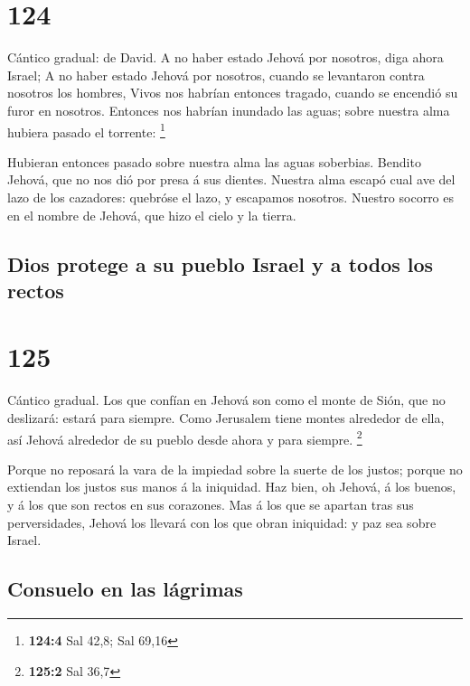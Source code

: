 \hypertarget{section-123}{%
\section{124}\label{section-123}}

 Cántico gradual: de David. A no haber estado Jehová por
nosotros, diga ahora Israel;  A no haber estado Jehová por
nosotros, cuando se levantaron contra nosotros los hombres, 
Vivos nos habrían entonces tragado, cuando se encendió su furor en
nosotros.  Entonces nos habrían inundado las aguas; sobre
nuestra alma hubiera pasado el torrente: \footnote{\textbf{124:4} Sal
  42,8; Sal 69,16}

 Hubieran entonces pasado sobre nuestra alma las aguas
soberbias.  Bendito Jehová, que no nos dió por presa á sus
dientes.  Nuestra alma escapó cual ave del lazo de los
cazadores: quebróse el lazo, y escapamos nosotros.  Nuestro
socorro es en el nombre de Jehová, que hizo el cielo y la tierra.

\hypertarget{dios-protege-a-su-pueblo-israel-y-a-todos-los-rectos}{%
\subsection{Dios protege a su pueblo Israel y a todos los
rectos}\label{dios-protege-a-su-pueblo-israel-y-a-todos-los-rectos}}

\hypertarget{section-124}{%
\section{125}\label{section-124}}

 Cántico gradual. Los que confían en Jehová son como el
monte de Sión, que no deslizará: estará para siempre.  Como
Jerusalem tiene montes alrededor de ella, así Jehová alrededor de su
pueblo desde ahora y para siempre. \footnote{\textbf{125:2} Sal 36,7}

 Porque no reposará la vara de la impiedad sobre la suerte
de los justos; porque no extiendan los justos sus manos á la iniquidad.
 Haz bien, oh Jehová, á los buenos, y á los que son rectos
en sus corazones.  Mas á los que se apartan tras sus
perversidades, Jehová los llevará con los que obran iniquidad: y paz sea
sobre Israel.

\hypertarget{consuelo-en-las-luxe1grimas}{%
\subsection{Consuelo en las
lágrimas}\label{consuelo-en-las-luxe1grimas}}

